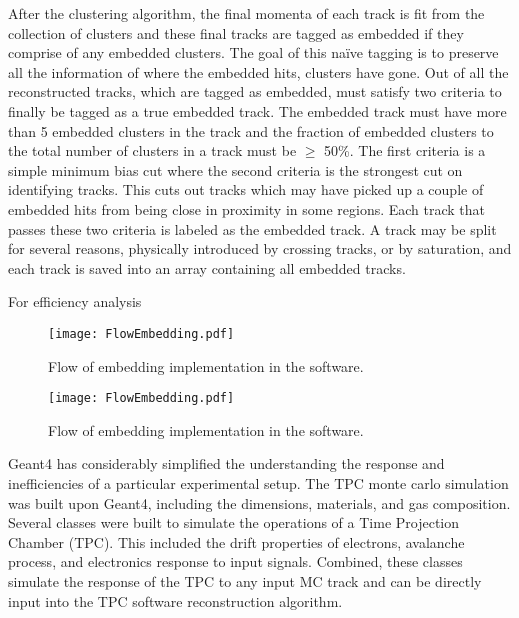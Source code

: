 After the clustering algorithm, the final momenta of each track is fit from the collection of clusters and these final tracks are tagged as embedded if they comprise of any embedded clusters. The goal of this na\"ive tagging is to preserve all the information of where the embedded hits, clusters have gone. Out of all the reconstructed tracks, which are tagged as embedded, must satisfy two criteria to finally be tagged as a true embedded track. The embedded track must have more than 5 embedded clusters in the track and the fraction of embedded clusters to the total number of clusters in a track must be $\geq$ 50\%. The first criteria is a simple minimum bias cut where the second criteria is the strongest cut on identifying tracks. This cuts out tracks which may have picked up a couple of embedded hits from being close in proximity in some regions. Each track that passes these two criteria is labeled as the embedded track. A track may be split for several reasons, physically introduced by crossing tracks, or by saturation, and each track is saved into an array containing all embedded tracks. 

For efficiency analysis 


\begin{sidewaysfigure}[H]
\centering
\texttt{[image: FlowEmbedding.pdf]}
\caption{Flow of embedding implementation in the software.}
\label{fig:flow}
\end{sidewaysfigure}




\begin{figure}[H]
\centering
\texttt{[image: FlowEmbedding.pdf]}
\caption{Flow of embedding implementation in the software.}
\label{fig:flow}
\end{figure}















Geant4 has considerably simplified the understanding the response and inefficiencies of a particular experimental setup. The TPC monte carlo simulation was built upon Geant4, including the dimensions, materials, and gas composition. Several classes were built to simulate the operations of a Time Projection Chamber (TPC). This included the drift properties of electrons, avalanche process, and electronics response to input signals. Combined, these classes simulate the response of the TPC to any input MC track and can be directly input into the \spirit TPC software reconstruction algorithm. 

